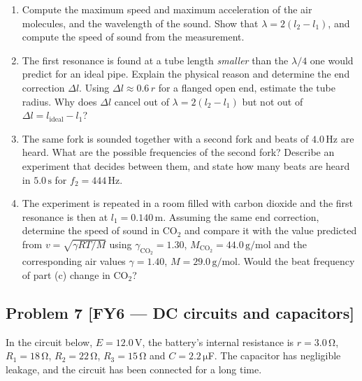\documentclass[11pt,a4paper]{article}
\newcommand{\problem}[3]{%
  \subsection*{Problem #1 \;\textnormal{\small[#2]}}\label{prob:#3}%
}
\newcommand{\unit}[1]{\,\mathrm{#1}}
\newenvironment{parts}{\begin{enumerate}[label=\textbf{\alph*)}]}{\end{enumerate}}
\begin{document}
\begin{parts}
\item Compute the maximum speed and maximum acceleration of the air
      molecules, and the wavelength of the sound. Show that
      $\lambda=2(l_2-l_1)$, and compute the speed of sound from the
      measurement.
\item The first resonance is found at a tube length \emph{smaller} than the
      $\lambda/4$ one would predict for an ideal pipe. Explain the physical
      reason and determine the end correction $\Delta l$. Using
      $\Delta l\approx0.6\,r$ for a flanged open end, estimate the tube
      radius. Why does $\Delta l$ cancel out of $\lambda=2(l_2-l_1)$ but not
      out of $\Delta l=l_{\text{ideal}}-l_1$?
\item The same fork is sounded together with a second fork and beats of
      $4.0\unit{Hz}$ are heard. What are the possible frequencies of the
      second fork? Describe an experiment that decides between them, and
      state how many beats are heard in $5.0\unit{s}$ for
      $f_2=444\unit{Hz}$.
\item The experiment is repeated in a room filled with carbon dioxide and the
      first resonance is then at $l_1=0.140\unit{m}$. Assuming the same end
      correction, determine the speed of sound in CO$_2$ and compare it with
      the value predicted from $v=\sqrt{\gamma RT/M}$ using
      $\gamma_{\text{CO}_2}=1.30$, $M_{\text{CO}_2}=44.0\unit{g/mol}$ and the
      corresponding air values $\gamma=1.40$, $M=29.0\unit{g/mol}$.
      Would the beat frequency of part (c) change in CO$_2$?
\end{parts}

\problem{7}{FY6 --- DC circuits and capacitors}{fy6}

In the circuit below, $E=12.0\unit{V}$, the battery's internal resistance is
$r=3.0\unit{\Omega}$, $R_1=18\unit{\Omega}$, $R_2=22\unit{\Omega}$,
$R_3=15\unit{\Omega}$ and $C=2.2\unit{\mu}$F. The capacitor has negligible
leakage, and the circuit has been connected for a long time.
\end{document}
